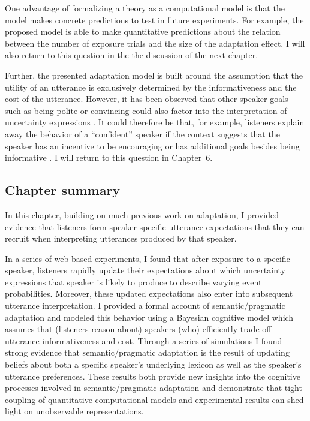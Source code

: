 One advantage of formalizing a theory as a computational model is that the model 
makes concrete predictions to test in future experiments. For example, the proposed
model is able to make quantitative predictions about the relation between the number of exposure
trials and the size of the adaptation effect. I will also return to this question in the the discussion of the next chapter.

Further, the presented adaptation model is built around the assumption that the utility of an utterance is exclusively determined
by the informativeness and the cost of the utterance. However, it has been observed that other speaker goals such as being polite or
convincing could also factor into the interpretation of uncertainty expressions \parencite[see e.g,][]{Pighin2011,Juanchich2013,Holtgraves2016}.
It could therefore be that, for example, listeners explain away the behavior of a ``confident'' speaker if the context suggests that the speaker
has an incentive to be encouraging or has additional goals besides being informative \parencite[see also][]{Yoon2016,Yoon2017}. I will return to this question in Chapter~6.


\subsection{Chapter summary}

In this chapter, building on much previous work on adaptation, I provided evidence that listeners form speaker-specific utterance expectations that they can recruit when interpreting utterances produced by that speaker.

In a series of web-based experiments, I found that after exposure to a specific speaker, listeners rapidly update 
their expectations about which uncertainty expressions that speaker is likely to produce
to describe varying event probabilities. Moreover, these updated expectations also enter into subsequent utterance interpretation.
I provided a formal account of semantic/pragmatic adaptation and modeled this behavior using a Bayesian cognitive model 
which assumes that (listeners reason about) speakers (who) efficiently trade off utterance informativeness and cost.
Through a series of simulations I found strong evidence that semantic/pragmatic adaptation is the result of
updating beliefs about both a specific speaker's underlying lexicon as well as the speaker's utterance
preferences. These results both provide new insights into the cognitive processes involved in semantic/pragmatic adaptation
and demonstrate that tight coupling of quantitative computational models and experimental results can shed light on
unobservable representations.

